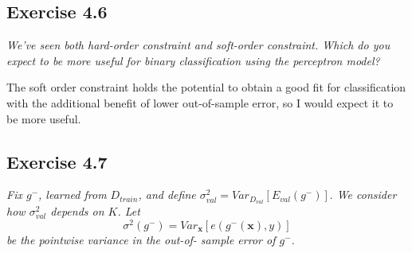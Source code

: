 \documentclass{article}
\renewcommand{\vec}[1]{\mathbf{#1}}
\begin{document}
\subsection*{Exercise 4.6}

\textit{We've seen both hard-order constraint and soft-order constraint. Which do you expect to
be more useful for binary classification using the perceptron model?}

\smallskip

The soft order constraint holds the potential to obtain a good fit for classification with the
additional benefit of lower out-of-sample error, so I would expect it to be more useful.

\subsection*{Exercise 4.7}

\textit{Fix $g^-$, learned from $D_{train}$, and define $\sigma_{val}^2 = Var_{D_{val}}[E_{val}(g^-)
].$ We consider how $\sigma_{val}^2$ depends on $K$. Let 
$$\sigma^2(g^-) = Var_{\vec{x}}[e(g^-(\vec{x}), y)]$$ be the pointwise variance in the out-of-
sample error of $g^-$.}
\end{document}
